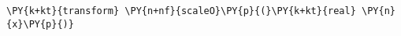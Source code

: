 \begin{Verbatim}[commandchars=\\\{\}]
    \PY{k+kt}{transform} \PY{n+nf}{scaleO}\PY{p}{(}\PY{k+kt}{real} \PY{n}{x}\PY{p}{)}
\end{Verbatim}
